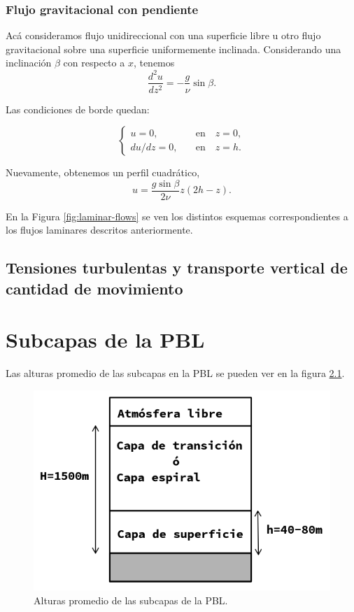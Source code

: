 \documentclass[openany,a4]{book}
\begin{document}
\subsection{Flujo gravitacional con pendiente}
Acá consideramos flujo unidireccional con una superficie libre 
u otro flujo gravitacional sobre una superficie uniformemente
inclinada. Considerando una inclinación $\beta$ con respecto a
$x$, tenemos
\begin{equation}
    \frac{d^2u}{dz^2}=-\frac{g}{\nu}\sin{\beta}.
\end{equation}

\par Las condiciones de borde quedan:

\begin{equation}
    \begin{cases}
        u=0,&\quad \mathrm{en}\quad z=0,\\
        du/dz=0,&\quad \mathrm{en}\quad z=h.
    \end{cases}
\end{equation}

\par Nuevamente, obtenemos un perfil cuadrático,
\begin{equation}
    u=\frac{g\sin\beta}{2\nu}z(2h-z).
\end{equation}

En la Figura \ref{fig:laminar-flows} se ven los distintos esquemas
correspondientes a los flujos laminares descritos anteriormente.

\section{Tensiones turbulentas y transporte vertical de cantidad de movimiento}

\chapter{Subcapas de la PBL}
Las alturas promedio de las subcapas en la PBL se pueden ver en la
figura \ref{fig:subcapas-pbl}.
\begin{figure}[htbp]
    \centering
    \includegraphics[width=0.8\linewidth]{img/subcapas_PBL.png}
    \caption{Alturas promedio de las subcapas de la PBL.}
    \label{fig:subcapas-pbl}
\end{figure}
\end{document}
